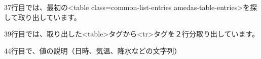 37行目では、最初の{\textless}table class={\textquotedbl}common-list-entries
amedas-table-entries{\textquotedbl}{\textgreater}を探して取り出しています。

39行目では、取り出した{\textless}table{\textgreater}タグから{\textless}tr{\textgreater}タグを２行分取り出しています。

44行目で、値の説明（日時、気温、降水などの文字列）



